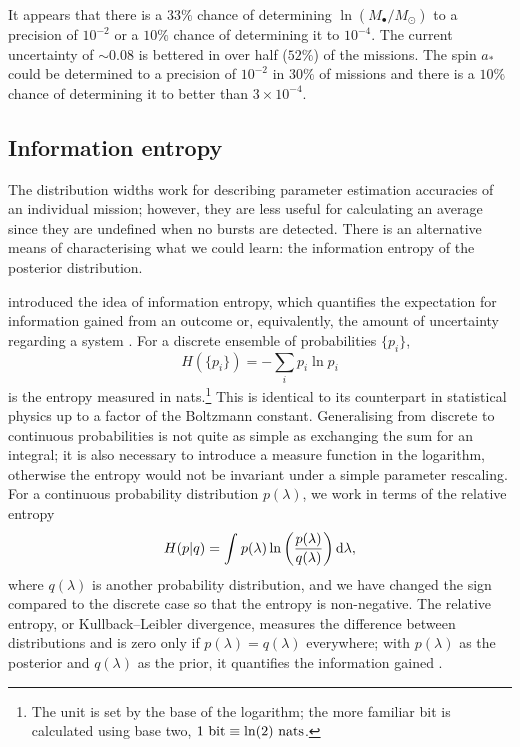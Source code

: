 It appears that there is a $33\%$ chance of determining $\ln (M_\bullet/M_\odot)$ to a precision of $10^{-2}$ or a $10\%$ chance of determining it to $10^{-4}$. The current uncertainty of $\sim 0.08$ is bettered in over half ($52\%$) of the missions. The spin $a_\ast$ could be determined to a precision of $10^{-2}$ in $30\%$ of missions and there is a $10\%$ chance of determining it to better than $3\times 10^{-4}$.

\subsection{Information entropy}

The distribution widths work for describing parameter estimation accuracies of an individual mission; however, they are less useful for calculating an average since they are undefined when no bursts are detected. There is an alternative means of characterising what we could learn: the information entropy of the posterior distribution.

\citet{Shannon1948,Shannon1948a} introduced the idea of information entropy, which quantifies the expectation for information gained from an outcome or, equivalently, the amount of uncertainty regarding a system \citep[chapters 2 and 4]{MacKay2003}. For a discrete ensemble of probabilities $\{p_i\}$,
\begin{equation}
H(\{p_i\}) = -\sum_i p_i \ln p_i
\end{equation}
is the entropy measured in nats.\footnote{The unit is set by the base of the logarithm; the more familiar bit is calculated using base two, $1~\mathrm{bit} \equiv \ln(2)~\mathrm{nats}$.} This is identical to its counterpart in statistical physics up to a factor of the Boltzmann constant. Generalising from discrete to continuous probabilities is not quite as simple as exchanging the sum for an integral; it is also necessary to introduce a measure function in the logarithm, otherwise the entropy would not be invariant under a simple parameter rescaling. For a continuous probability distribution $p(\lambda)$, we work in terms of the relative entropy \citep[section 1.4]{Ihara1993}
\begin{equation}
H(p|q) = \int_{}^{}{p(\lambda)\ln\left(\dfrac{p(\lambda)}{q(\lambda)}\right)}\,\mathrm{d}{\lambda},
\end{equation}
where $q(\lambda)$ is another probability distribution, and we have changed the sign compared to the discrete case so that the entropy is non-negative. The relative entropy, or Kullback--Leibler divergence, measures the difference between distributions and is zero only if $p(\lambda) = q(\lambda)$ everywhere; with $p(\lambda)$ as the posterior and $q(\lambda)$ as the prior, it quantifies the information gained \citep{Kullback1951}.

